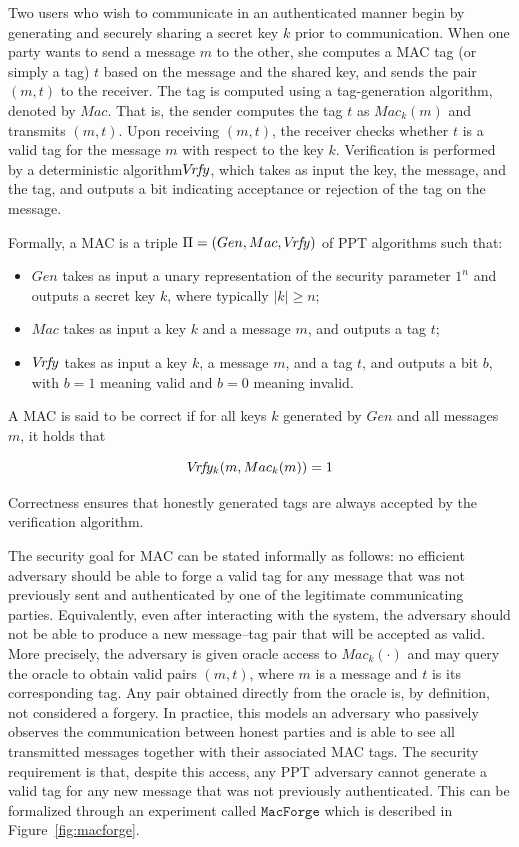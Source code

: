 Two users who wish to communicate in an authenticated manner begin by generating and securely sharing a secret key $k$ prior to communication. When one party wants to send a message $m$ to the other, she computes a MAC tag (or simply a tag) $t$ based on the message and the shared key, and sends the pair $(m, t)$ to the receiver. The tag is computed using a tag-generation algorithm, denoted by $Mac$. That is, the sender computes the tag $t$ as $Mac_k(m)$ and transmits $(m, t)$. Upon receiving $(m, t)$, the receiver checks whether $t$ is a valid tag for the message $m$ with respect to the key $k$. Verification is performed by a deterministic algorithm$V\!r\!f\!y$, which takes as input the key, the message, and the tag, and outputs a bit indicating acceptance or rejection of the tag on the message.

Formally, a MAC is a triple $\Pi = (Gen, Mac, V\!r\!f\!y)$ of PPT algorithms such that:
\begin{itemize}
\item $Gen$ takes as input a unary representation of the security parameter $1^n$ and outputs a secret key $k$, where typically $|k| \geq n$;
\item $Mac$ takes as input a key $k$ and a message $m$, and outputs a tag $t$;
\item $V\!r\!f\!y$ takes as input a key $k$, a message $m$, and a tag $t$, and outputs a bit $b$, with $b = 1$ meaning valid and $b = 0$ meaning invalid.
\end{itemize}

A MAC is said to be correct if for all keys $k$ generated by $Gen$ and all messages $m$, it holds that

\[
V\!r\!f\!y_k(m,Mac_k(m))=1
\]

Correctness ensures that honestly generated tags are always accepted by the verification algorithm.

The security goal for MAC can be stated informally as follows: no efficient adversary should be able to forge a valid tag for any message that was not previously sent and authenticated by one of the legitimate communicating parties. Equivalently, even after interacting with the system, the adversary should not be able to produce a new message–tag pair that will be accepted as valid. More precisely, the adversary is given oracle access to $Mac_k(\cdot)$ and may query the oracle to obtain valid pairs $(m,t)$, where $m$ is a message and $t$ is its corresponding tag. Any pair obtained directly from the oracle is, by definition, not considered a forgery. In practice, this models an adversary who passively observes the communication between honest parties and is able to see all transmitted messages together with their associated MAC tags. The security requirement is that, despite this access, any PPT adversary cannot generate a valid tag for any new message that was not previously authenticated. This can be formalized through an experiment called $\mathtt{MacForge}$ which is described in Figure~\ref{fig:macforge}.

